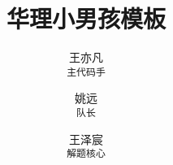 \documentclass{report}
\begin{document}
\title{华理小男孩模板}
\author{
王亦凡 \\ 
\texttt{主代码手}
\and
姚远 \\ 
\texttt{队长}
\and
王泽宸 \\ 
\texttt{解题核心}
}

\maketitle
\tableofcontents
\newpage












\end{document}
